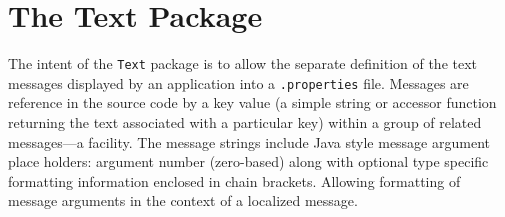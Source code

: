 %
%
%
%
%
%
%
%

\chapter{The Text Package}
\label{chp:text}

The intent of the \texttt{Text} package is to allow the separate
definition of the text messages displayed by an application into a
\texttt{.properties} file.  Messages are reference in the source code
by a key value (a simple string or accessor function returning the text
associated with a particular key) within a group of related messages---a
facility.  The message strings include Java style message argument
place holders: argument number (zero-based) along with optional type specific
formatting information enclosed in chain brackets.  Allowing formatting
of message arguments in the context of a localized message.

